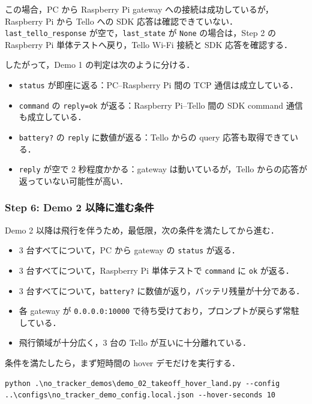 この場合，PC から Raspberry Pi gateway への接続は成功しているが，Raspberry Pi から Tello への SDK 応答は確認できていない．\texttt{last\_tello\_response} が空で，\texttt{last\_state} が \texttt{None} の場合は，Step 2 の Raspberry Pi 単体テストへ戻り，Tello Wi-Fi 接続と SDK 応答を確認する．

したがって，Demo 1 の判定は次のように分ける．

\begin{itemize}
  \item \texttt{status} が即座に返る：PC--Raspberry Pi 間の TCP 通信は成立している．
  \item \texttt{command} の \texttt{reply=ok} が返る：Raspberry Pi--Tello 間の SDK command 通信も成立している．
  \item \texttt{battery?} の \texttt{reply} に数値が返る：Tello からの query 応答も取得できている．
  \item \texttt{reply} が空で 2 秒程度かかる：gateway は動いているが，Tello からの応答が返っていない可能性が高い．
\end{itemize}

\subsubsection{Step 6: Demo 2 以降に進む条件}

Demo 2 以降は飛行を伴うため，最低限，次の条件を満たしてから進む．

\begin{itemize}
  \item 3 台すべてについて，PC から gateway の \texttt{status} が返る．
  \item 3 台すべてについて，Raspberry Pi 単体テストで \texttt{command} に \texttt{ok} が返る．
  \item 3 台すべてについて，\texttt{battery?} に数値が返り，バッテリ残量が十分である．
  \item 各 gateway が \texttt{0.0.0.0:10000} で待ち受けており，プロンプトが戻らず常駐している．
  \item 飛行領域が十分広く，3 台の Tello が互いに十分離れている．
\end{itemize}

条件を満たしたら，まず短時間の hover デモだけを実行する．

\begin{lstlisting}
python .\no_tracker_demos\demo_02_takeoff_hover_land.py --config ..\configs\no_tracker_demo_config.local.json --hover-seconds 10
\end{lstlisting}

